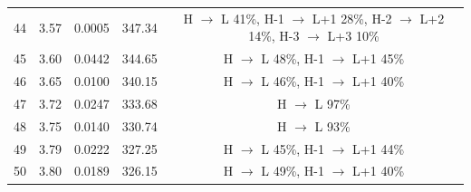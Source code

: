 \begin{table}[H]
{\begin{center}
\begin{tabular}{ccccc}
44 & 3.57 & 0.0005 & 347.34 & H $\rightarrow$ L 41\%, H-1 $\rightarrow$ L+1 28\%, H-2 $\rightarrow$ L+2 14\%, H-3 $\rightarrow$ L+3 10\% \\
45 & 3.60 & 0.0442 & 344.65 & H $\rightarrow$ L 48\%, H-1 $\rightarrow$ L+1 45\% \\
46 & 3.65 & 0.0100 & 340.15 & H $\rightarrow$ L 46\%, H-1 $\rightarrow$ L+1 40\% \\
47 & 3.72 & 0.0247 & 333.68 & H $\rightarrow$ L 97\% \\
48 & 3.75 & 0.0140 & 330.74 & H $\rightarrow$ L 93\% \\
49 & 3.79 & 0.0222 & 327.25 & H $\rightarrow$ L 45\%, H-1 $\rightarrow$ L+1 44\% \\
50 & 3.80 & 0.0189 & 326.15 & H $\rightarrow$ L 49\%, H-1 $\rightarrow$ L+1 40\% \\
\hline
\end{tabular}
\end{center} }
\vspace{-0.2cm}
\end{table} \newpage \noindent


